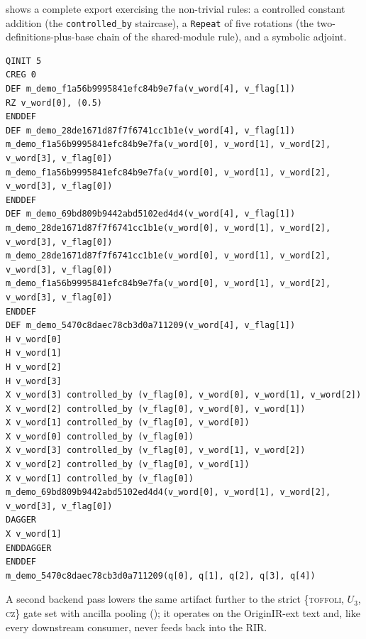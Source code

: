  shows a complete export exercising the
non-trivial rules: a controlled constant addition (the
\texttt{controlled\_by} staircase), a \texttt{Repeat} of five rotations
(the two-definitions-plus-base chain of the shared-module rule), and a
symbolic adjoint.

\begin{lstlisting}[style=pyqir, caption={OriginIR-ext export (verbatim \texttt{export\_originir} output) of the module \texttt{demo\{word: UInt(4), flag: Bits(1)\}} that applies \texttt{h} to \texttt{word}, adds the constant 3 under control of \texttt{flag}, repeats \texttt{rz(0.5)} on \texttt{word[0]} five times, and adjoints \texttt{x} on \texttt{word[1]}.  The three \texttt{m\_demo\_*} definitions are the logarithmic chain for count 5; note the propagated \texttt{v\_flag[0]} argument replacing per-gate controls inside called modules.}, label={lst:originir-lowered}]
QINIT 5
CREG 0
DEF m_demo_f1a56b9995841efc84b9e7fa(v_word[4], v_flag[1])
RZ v_word[0], (0.5)
ENDDEF
DEF m_demo_28de1671d87f7f6741cc1b1e(v_word[4], v_flag[1])
m_demo_f1a56b9995841efc84b9e7fa(v_word[0], v_word[1], v_word[2], v_word[3], v_flag[0])
m_demo_f1a56b9995841efc84b9e7fa(v_word[0], v_word[1], v_word[2], v_word[3], v_flag[0])
ENDDEF
DEF m_demo_69bd809b9442abd5102ed4d4(v_word[4], v_flag[1])
m_demo_28de1671d87f7f6741cc1b1e(v_word[0], v_word[1], v_word[2], v_word[3], v_flag[0])
m_demo_28de1671d87f7f6741cc1b1e(v_word[0], v_word[1], v_word[2], v_word[3], v_flag[0])
m_demo_f1a56b9995841efc84b9e7fa(v_word[0], v_word[1], v_word[2], v_word[3], v_flag[0])
ENDDEF
DEF m_demo_5470c8daec78cb3d0a711209(v_word[4], v_flag[1])
H v_word[0]
H v_word[1]
H v_word[2]
H v_word[3]
X v_word[3] controlled_by (v_flag[0], v_word[0], v_word[1], v_word[2])
X v_word[2] controlled_by (v_flag[0], v_word[0], v_word[1])
X v_word[1] controlled_by (v_flag[0], v_word[0])
X v_word[0] controlled_by (v_flag[0])
X v_word[3] controlled_by (v_flag[0], v_word[1], v_word[2])
X v_word[2] controlled_by (v_flag[0], v_word[1])
X v_word[1] controlled_by (v_flag[0])
m_demo_69bd809b9442abd5102ed4d4(v_word[0], v_word[1], v_word[2], v_word[3], v_flag[0])
DAGGER
X v_word[1]
ENDDAGGER
ENDDEF
m_demo_5470c8daec78cb3d0a711209(q[0], q[1], q[2], q[3], q[4])
\end{lstlisting}

A second backend pass lowers the same artifact further to the strict
\{\textsc{toffoli}, $U_3$, \textsc{cz}\} gate set with ancilla pooling
(); it operates on the OriginIR-ext text and,
like every downstream consumer, never feeds back into the RIR.


